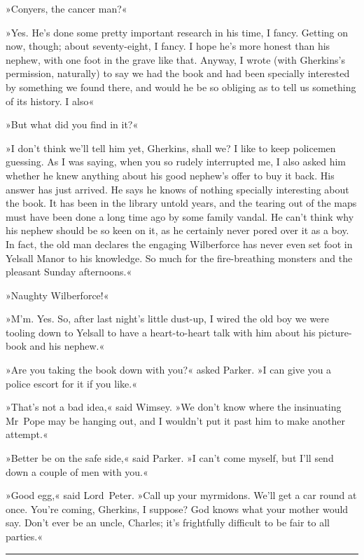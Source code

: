 »Conyers, the cancer man?«

»Yes. He's done some pretty important research in his time, I fancy. Getting on now, though; about seventy-eight, I fancy. I hope he's more honest than his nephew, with one foot in the grave like that. Anyway, I wrote (with Gherkins's permission, naturally) to say we had the book and had been specially interested by something we found there, and would he be so obliging as to tell us something of its history. I also\longdash«

»But what did you find in it?«

»I don't think we'll tell him yet, Gherkins, shall we? I like to keep policemen guessing. As I was saying, when you so rudely interrupted me, I also asked him whether he knew anything about his good nephew's offer to buy it back. His answer has just arrived. He says he knows of nothing specially interesting about the book. It has been in the library untold years, and the tearing out of the maps must have been done a long time ago by some family vandal. He can't think why his nephew should be so keen on it, as he certainly never pored over it as a boy. In fact, the old man declares the engaging Wilberforce has never even set foot in Yelsall Manor to his knowledge. So much for the fire-breathing monsters and the pleasant Sunday afternoons.«

»Naughty Wilberforce!«

»M'm. Yes. So, after last night's little dust-up, I wired the old boy we were tooling down to Yelsall to have a heart-to-heart talk with him about his picture-book and his nephew.«

»Are you taking the book down with you?« asked Parker. »I can give you a police escort for it if you like.«

»That's not a bad idea,« said Wimsey. »We don't know where the insinuating Mr~Pope may be hanging out, and I wouldn't put it past him to make another attempt.«

»Better be on the safe side,« said Parker. »I can't come myself, but I'll send down a couple of men with you.«

»Good egg,« said Lord~Peter. »Call up your myrmidons. We'll get a car round at once. You're coming, Gherkins, I suppose? God knows what your mother would say. Don't ever be an uncle, Charles; it's frightfully difficult to be fair to all parties.«

\noindent\hfil\rule{0.5\textwidth}{.4pt}\hfil 

